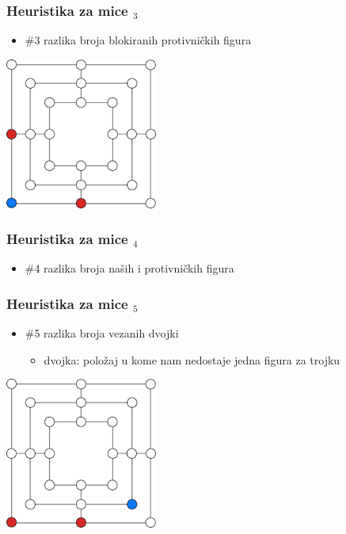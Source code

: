 \documentclass[compress,aspectratio=169]{beamer}
\begin{document}
\begin{frame}[fragile]
  \frametitle{Heuristika za mice $_3$}
  \begin{itemize}
    \item \#3 razlika broja blokiranih protivničkih figura
  \end{itemize}
  \begin{center}
    \includegraphics[width=5cm]{prj-01-pic15.pdf}
  \end{center}
\end{frame}

\begin{frame}[fragile]
  \frametitle{Heuristika za mice $_4$}
  \begin{itemize}
    \item \#4 razlika broja naših i protivničkih figura
  \end{itemize}
\end{frame}

\begin{frame}[fragile]
  \frametitle{Heuristika za mice $_5$}
  \begin{itemize}
    \item \#5 razlika broja vezanih dvojki
    \begin{itemize}
      \item dvojka: položaj u kome nam nedostaje jedna figura za trojku
    \end{itemize}
  \end{itemize}
  \begin{center}
    \includegraphics[width=5cm]{prj-01-pic16.pdf}
  \end{center}
\end{frame}
\end{document}
